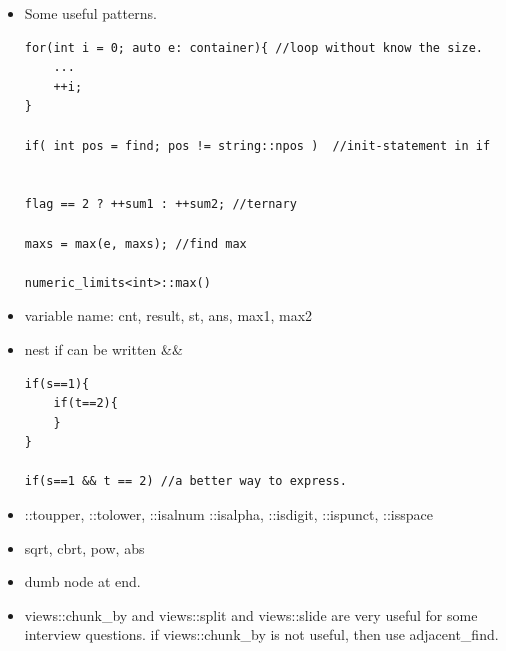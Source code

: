 \documentclass[a4paper,11pt,twoside]{book}
\begin{document}
\begin{itemize}
	\item Some useful patterns.
\begin{lstlisting}
for(int i = 0; auto e: container){ //loop without know the size.
	...
	++i;
}       

if( int pos = find; pos != string::npos )  //init-statement in if
                   

flag == 2 ? ++sum1 : ++sum2; //ternary

maxs = max(e, maxs); //find max

numeric_limits<int>::max()
\end{lstlisting}

	\item variable name: cnt, result, st, ans, max1, max2
	
	\item nest if can be written \&\&
\begin{lstlisting}
if(s==1){
	if(t==2){
	}
}

if(s==1 && t == 2) //a better way to express. 
\end{lstlisting}

	\item ::toupper, ::tolower, ::isalnum ::isalpha, ::isdigit, ::ispunct, ::isspace

	\item sqrt, cbrt, pow, abs
	
	\item dumb node at end. 
	
	\item views::chunk\_by and views::split and views::slide are very useful for some interview questions. if views::chunk\_by is not useful, then use adjacent\_find.
		
\end{itemize}
\end{document}
